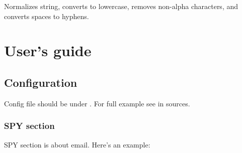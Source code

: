 \documentclass[letterpaper,10pt,english]{sphinxmanual}
\begin{document}
\begin{fulllineitems}
\begin{fulllineitems}
\label{index:spy.TextSite.set_diff}
\end{fulllineitems}


\begin{fulllineitems}
\label{index:spy.TextSite.set_new_content}
\end{fulllineitems}


\begin{fulllineitems}
\label{index:spy.TextSite.set_old_content}
\end{fulllineitems}


\end{fulllineitems}


\begin{fulllineitems}
\label{index:spy.main}
\end{fulllineitems}


\begin{fulllineitems}
\label{index:spy.slugify}
Normalizes string, converts to lowercase, removes non-alpha characters,
and converts spaces to hyphens.

\end{fulllineitems}



\chapter{User's guide}
\label{index:user-s-guide}

\section{Configuration}
\label{index:configuration}
Config file should be under . For full example see  in sources.


\subsection{SPY section}
\label{index:spy-section}
SPY section is about email. Here's an example:
\end{document}
